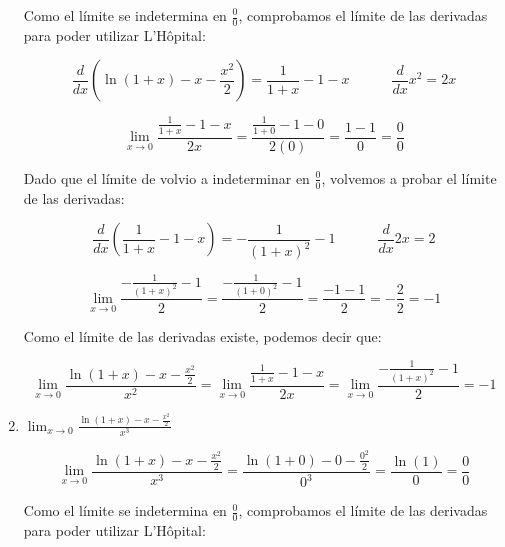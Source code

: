 \documentclass[12pt]{article}
\begin{document}
\begin{enumerate}[\hspace{9px} a)]
        Como el l\'imite se indetermina en \(\displaystyle\frac{0}{0}\), comprobamos el l\'imite de las derivadas para poder utilizar L'H\^opital:

        \begin{equation*}
            \frac{d}{dx}\left(\ln(1+x)-x-\frac{x^2}{2}\right) = \frac{1}{1+x}-1-x \qquad \quad \frac{d}{dx}x^2=2x
        \end{equation*}

        \begin{equation*}
            \lim_{x \to 0}\frac{\frac{1}{1+x}-1-x}{2x} = \frac{\frac{1}{1+0}-1-0}{2(0)} = \frac{1-1}{0} = \frac{0}{0}
        \end{equation*}

        Dado que el l\'imite de volvio a indeterminar en \(\displaystyle\frac{0}{0}\), volvemos a probar el l\'imite de las derivadas:

        \begin{equation*}
            \frac{d}{dx}\left(\frac{1}{1+x}-1-x\right)= -\frac{1}{(1+x)^2}-1 \qquad \quad \frac{d}{dx}2x=2
        \end{equation*}

        \begin{equation*}
            \lim_{x \to 0}\frac{-\frac{1}{(1+x)^2}-1}{2} = \frac{-\frac{1}{(1+0)^2}-1}{2} = \frac{-1-1}{2} = -\frac{2}{2} = -1
        \end{equation*}

        Como el l\'imite de las derivadas existe, podemos decir que:

        \begin{equation*}
            \lim_{x \to 0}\frac{\ln(1+x)-x-\frac{x^2}{2}}{x^2} =  \lim_{x \to 0}\frac{\frac{1}{1+x}-1-x}{2x} =  \lim_{x \to 0}\frac{-\frac{1}{(1+x)^2}-1}{2} = -1
        \end{equation*}

    \item \(\displaystyle\lim_{x \to 0}\frac{\ln(1+x)-x-\frac{x^2}{2}}{x^3}\)
        
        \begin{equation*}
            \lim_{x \to 0}\frac{\ln(1+x)-x-\frac{x^2}{2}}{x^3} = \frac{\ln(1+0)-0-\frac{0^2}{2}}{0^3} = \frac{\ln(1)}{0} = \frac{0}{0}
        \end{equation*}

        Como el l\'imite se indetermina en \(\displaystyle\frac{0}{0}\), comprobamos el l\'imite de las derivadas para poder utilizar L'H\^opital:


\end{enumerate}
\end{document}
